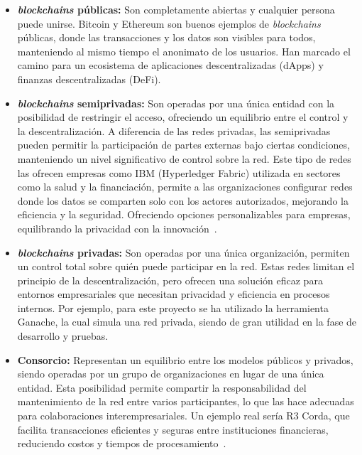 \begin{itemize}
\item \textbf{\textit{blockchains} públicas:} Son completamente abiertas y cualquier persona puede unirse. Bitcoin y Ethereum son buenos ejemplos de \textit{blockchains} públicas, donde las transacciones y los datos son visibles para todos, manteniendo al mismo tiempo el anonimato de los usuarios. Han marcado el camino para un ecosistema de aplicaciones descentralizadas (dApps) y finanzas descentralizadas (DeFi).

\item \textbf{\textit{blockchains} semiprivadas:} Son operadas por una única entidad con la posibilidad de restringir el acceso, ofreciendo un equilibrio entre el control y la descentralización. A diferencia de las redes privadas, las semiprivadas pueden permitir la participación de partes externas bajo ciertas condiciones, manteniendo un nivel significativo de control sobre la red.
Este tipo de redes las ofrecen empresas como IBM (Hyperledger Fabric) utilizada en sectores como la salud y la financiación, permite a las organizaciones configurar redes donde los datos se comparten solo con los actores autorizados, mejorando la eficiencia y la seguridad. Ofreciendo opciones personalizables para empresas, equilibrando la privacidad con la innovación~\cite{Hyperledger}.

\item \textbf{\textit{blockchains} privadas:} Son operadas por una única organización, permiten un control total sobre quién puede participar en la red. Estas redes limitan el principio de la descentralización, pero ofrecen una solución eficaz para entornos empresariales que necesitan privacidad y eficiencia en procesos internos.
Por ejemplo, para este proyecto se ha utilizado la herramienta Ganache, la cual simula una red privada, siendo de gran utilidad en la fase de desarrollo y pruebas.

\item \textbf{Consorcio:} Representan un equilibrio entre los modelos públicos y privados, siendo operadas por un grupo de organizaciones en lugar de una única entidad. Esta posibilidad permite compartir la responsabilidad del mantenimiento de la red entre varios participantes, lo que las hace adecuadas para colaboraciones interempresariales. 
Un ejemplo real sería R3 Corda, que facilita transacciones eficientes y seguras entre instituciones financieras, reduciendo costos y tiempos de procesamiento~\cite{R3Corda}.

\end{itemize} 


